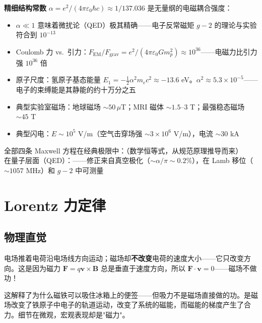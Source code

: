 \begin{oombox}[电磁相互作用的尺度]
  \textbf{精细结构常数} $\alpha = e^2/(4\pi\varepsilon_0\hbar c) \approx 1/137.036$ 是无量纲的电磁耦合强度：
  \begin{itemize}
    \item $\alpha \ll 1$ 意味着微扰论（QED）极其精确——电子反常磁矩 $g-2$ 的理论与实验符合到 $10^{-13}$
    \item Coulomb 力 vs.\ 引力：$F_{\text{EM}}/F_{\text{grav}} = e^2/(4\pi\varepsilon_0 G m_p^2) \approx 10^{36}$——电磁力比引力强 $10^{36}$ 倍
    \item 原子尺度：氢原子基态能量 $E_1 = -\frac{1}{2}\alpha^2 m_e c^2 \approx -13.6$ eV。$\alpha^2 \approx 5.3 \times 10^{-5}$——电子的束缚能是其静能的约十万分之五
    \item 典型实验室磁场：地球磁场 $\sim 50\,\mu$T；MRI 磁体 $\sim 1.5$--$3$ T；最强稳态磁场 $\sim 45$ T
    \item 典型闪电：$E \sim 10^5$ V/m（空气击穿场强 $\sim 3\times 10^6$ V/m），电流 $\sim 30$ kA
  \end{itemize}
\end{oombox}

  全部四条 Maxwell 方程在经典极限中：\precexact（数学恒等式，从规范原理推导而来）\\
  在量子层面（QED）：\preceffective——修正来自真空极化（$\sim \alpha/\pi \sim 0.2\%$），在 Lamb 移位（$\sim 1057$ MHz）和 $g-2$ 中可测量
\endprecisionbox

\section{Lorentz 力定律}

\subsection{物理直觉}

电场推着电荷沿电场线方向运动；磁场却\textbf{不改变}电荷的速度大小——它只改变方向。这是因为磁力 $\mathbf{F} = q\mathbf{v}\times\mathbf{B}$ 总是垂直于速度方向，所以 $\mathbf{F}\cdot\mathbf{v} = 0$——磁场不做功！

这解释了为什么磁铁可以吸住冰箱上的便签——但吸力不是磁场直接做的功。是磁场改变了铁原子中电子的轨道运动，改变了系统的磁能，而磁能的梯度产生了合力。细节在微观，宏观表现却是"磁力"。


